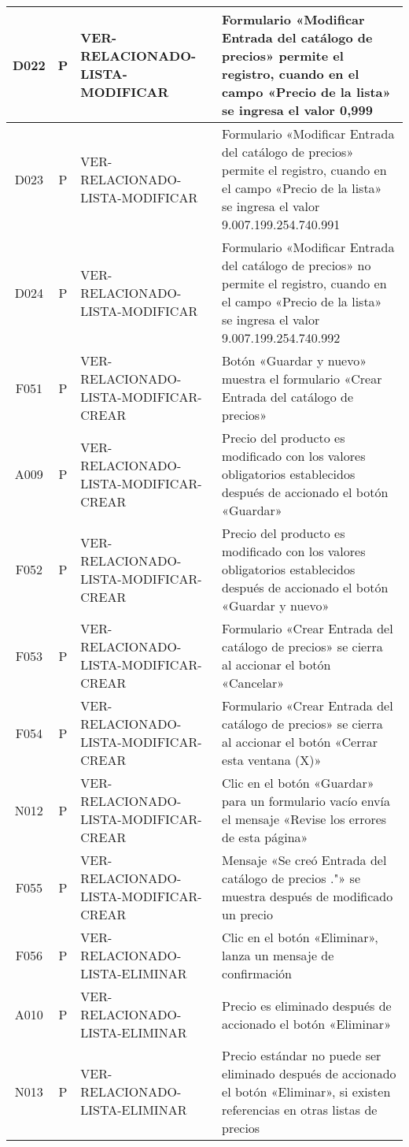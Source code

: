\begin{landscape}
{\begin{longtable}[htb]{|c|c|p{5.0cm}|p{14.0cm}|}
D022 & P & VER-RELACIONADO-LISTA-MODIFICAR & Formulario «Modificar Entrada del catálogo de precios» permite el registro, cuando en el campo «Precio de la lista» se ingresa el valor 0,999 \\ \hline
D023 & P & VER-RELACIONADO-LISTA-MODIFICAR & Formulario «Modificar Entrada del catálogo de precios» permite el registro, cuando en el campo «Precio de la lista» se ingresa el valor 9.007.199.254.740.991 \\ \hline
D024 & P & VER-RELACIONADO-LISTA-MODIFICAR & Formulario «Modificar Entrada del catálogo de precios» no permite el registro, cuando en el campo «Precio de la lista» se ingresa el valor 9.007.199.254.740.992 \\ \hline
F051 & P & VER-RELACIONADO-LISTA-MODIFICAR-CREAR & Botón «Guardar y nuevo» muestra el formulario «Crear Entrada del catálogo de precios» \\ \hline
A009 & P & VER-RELACIONADO-LISTA-MODIFICAR-CREAR & Precio del producto es modificado con los valores obligatorios establecidos después de accionado el botón «Guardar» \\ \hline
F052 & P & VER-RELACIONADO-LISTA-MODIFICAR-CREAR & Precio del producto es modificado con los valores obligatorios establecidos después de accionado el botón «Guardar y nuevo» \\ \hline
F053 & P & VER-RELACIONADO-LISTA-MODIFICAR-CREAR & Formulario «Crear Entrada del catálogo de precios» se cierra al accionar el botón «Cancelar» \\ \hline
F054 & P & VER-RELACIONADO-LISTA-MODIFICAR-CREAR & Formulario «Crear Entrada del catálogo de precios» se cierra al accionar el botón «Cerrar esta ventana (X)» \\ \hline
N012 & P & VER-RELACIONADO-LISTA-MODIFICAR-CREAR & Clic en el botón «Guardar» para un formulario vacío envía el mensaje «Revise los errores de esta página» \\ \hline
F055 & P & VER-RELACIONADO-LISTA-MODIFICAR-CREAR & Mensaje «Se creó Entrada del catálogo de precios ."» se muestra después de modificado un precio \\ \hline
F056 & P & VER-RELACIONADO-LISTA-ELIMINAR & Clic en el botón «Eliminar», lanza un mensaje de confirmación \\ \hline
A010 & P & VER-RELACIONADO-LISTA-ELIMINAR & Precio es eliminado después de accionado el botón «Eliminar» \\ \hline
N013 & P & VER-RELACIONADO-LISTA-ELIMINAR & Precio estándar no puede ser eliminado después de accionado el botón «Eliminar», si existen referencias en otras listas de precios \\ \hline

\end{longtable}}
\end{landscape}
